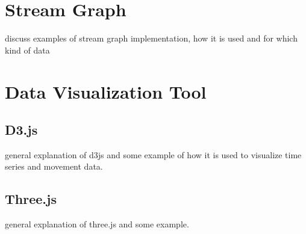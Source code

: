 \section{Stream Graph}
discuss examples of stream graph implementation, how it is used and for which kind of data

\section{Data Visualization Tool}
\subsection{D3.js}
general explanation of d3js and some example of how it is used to visualize time series and movement data.

\subsection{Three.js}
general explanation of three.js and some example.

